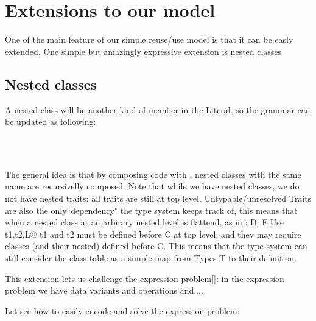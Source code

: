 \section{Extensions to our model}
  One of the main feature of our simple reuse/use model is that it can be
  easly extended. One simple but amazingly expressive extension is nested classes

\subsection{Nested classes}

A nested class will be another kind of member in the Literal, so  
the grammar can be updated as following:

\begin{bnf}
\prodFull{}\\
\prodFull{}
\end{bnf}\\

The general idea is that by composing code with \use, nested classes with the same name are recursivelly composed.
Note that while we have nested classes, we do not have nested traits: all traits are still
at top level.
Untypable/unresolved Traits are also the only``dependency"
the type system keeps track of, this means that when a nested class at an arbirary
nested level is flattend, as in
\Q@C:{ D:{ E:Use t1,t2,L}}@
t1 and t2 must be defined before C at top level; and they may require classes (and their
nested) defined before C. This means that the type system can still consider
the class table as a simple map from Types T to their definition.

This extension lets us challenge the expression problem[]:
in the expression problem we have data variants and operations and....

Let see how to easily encode and solve the expression problem:

